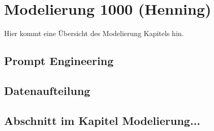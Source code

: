 \chapter{Modelierung 1000 (Henning)}
\label{sec:Kapitel3}

Hier kommt eine Übersicht des Modelierung Kapitels hin.

\section{Prompt Engineering}
\label{sec:abschnitt3.1}

\section{Datenaufteilung}

\section{Abschnitt im Kapitel Modelierung...}